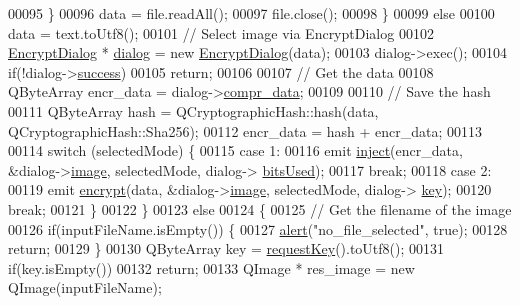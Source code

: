 \begin{DoxyCode}
00095             \}
00096             data = file.readAll();
00097             file.close();
00098         \}
00099         \textcolor{keywordflow}{else}
00100             data = text.toUtf8();
00101         \textcolor{comment}{// Select image via EncryptDialog}
00102         \hyperlink{class_encrypt_dialog}{EncryptDialog} * \hyperlink{class_view_p_c_a31abbb470fe329b44e6ffee202b903ca}{dialog} = \textcolor{keyword}{new} \hyperlink{class_encrypt_dialog}{EncryptDialog}(data);
00103         dialog->exec();
00104         \textcolor{keywordflow}{if}(!dialog->\hyperlink{class_encrypt_dialog_ada4900bcd40894d9c098c65aa4066ac9}{success})
00105             \textcolor{keywordflow}{return};
00106 
00107         \textcolor{comment}{// Get the data}
00108         QByteArray encr\_data = dialog->\hyperlink{class_encrypt_dialog_a3e8998aa39696cbd1242f6420ef18143}{compr\_data};
00109 
00110         \textcolor{comment}{// Save the hash}
00111         QByteArray hash = QCryptographicHash::hash(data, QCryptographicHash::Sha256);
00112         encr\_data = hash + encr\_data;
00113 
00114         \textcolor{keywordflow}{switch} (selectedMode) \{
00115         \textcolor{keywordflow}{case} 1:
00116             emit \hyperlink{class_view_p_c_a652c98014c2df32178d43a5a9612dd99}{inject}(encr\_data, &dialog->\hyperlink{class_encrypt_dialog_a739a0df1d28d06b28a3fd16e2bc16c73}{image}, selectedMode, dialog->
      \hyperlink{class_encrypt_dialog_abf638fea37fbdbaba215954e2e239860}{bitsUsed});
00117             \textcolor{keywordflow}{break};
00118         \textcolor{keywordflow}{case} 2:
00119             emit \hyperlink{class_view_p_c_a9d179ff85ed8b1ca0ff7fa495965b52d}{encrypt}(data, &dialog->\hyperlink{class_encrypt_dialog_a739a0df1d28d06b28a3fd16e2bc16c73}{image}, selectedMode, dialog->
      \hyperlink{class_encrypt_dialog_a1afdef3c665fb0d0fae06d1df8e84951}{key});
00120             \textcolor{keywordflow}{break};
00121         \}
00122     \}
00123     \textcolor{keywordflow}{else}
00124     \{
00125         \textcolor{comment}{// Get the filename of the image}
00126         \textcolor{keywordflow}{if}(inputFileName.isEmpty()) \{
00127             \hyperlink{class_view_p_c_a7c467169467789561078abc9d4fe57bd}{alert}(\textcolor{stringliteral}{"no\_file\_selected"}, \textcolor{keyword}{true});
00128             \textcolor{keywordflow}{return};
00129         \}
00130         QByteArray key = \hyperlink{class_view_p_c_a559c95675ec98b15451f3bca47033d9c}{requestKey}().toUtf8();
00131         \textcolor{keywordflow}{if}(key.isEmpty())
00132             \textcolor{keywordflow}{return};
00133         QImage * res\_image = \textcolor{keyword}{new} QImage(inputFileName);

\end{DoxyCode}
